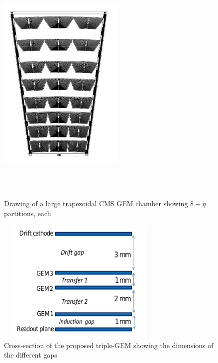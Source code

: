 \begin{figure}[htb]
	\begin{center}
		\includegraphics[width=6.0cm,height=12cm]{figures/GEM/gemTrapezoidal.png}
		\caption{Drawing of a large trapezoidal CMS GEM chamber showing $8-\eta$ partitions, each}
		\label{gemTrapezoidal}
	\end{center}
\end{figure} 
\begin{figure}[htb]
	\begin{center}
		\includegraphics[width=8.0cm,height=6cm]{figures/GEM/tripple-gem.png}
		\caption{Cross-section of the proposed triple-GEM showing the dimensions of the different gaps}
		\label{tripple-gem}
	\end{center}
\end{figure} 

